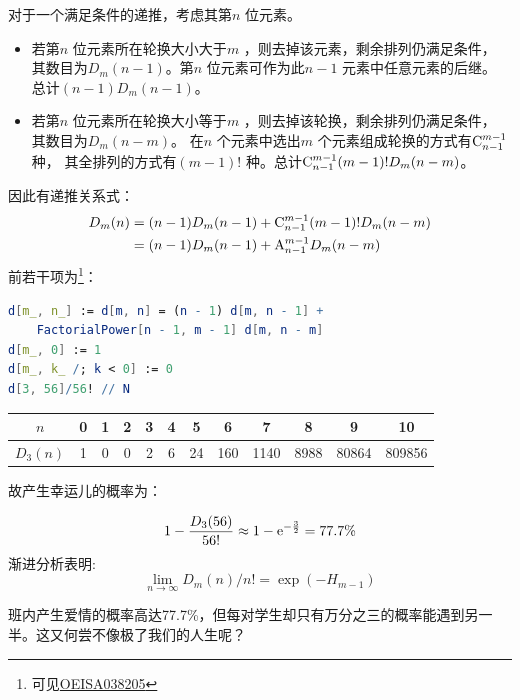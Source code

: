 对于一个满足条件的递推，考虑其第\(n\) 位元素。
\begin{itemize}
    \item 若第\(n\) 位元素所在轮换大小大于\(m\) ，则去掉该元素，剩余排列仍满足条件，
        其数目为\(D_{m}(n-1)\)。第\(n\) 位元素可作为此\(n-1\) 元素中任意元素的后继。
        总计\((n-1)D_{m}(n-1)\)。
    \item 若第\(n\) 位元素所在轮换大小等于\(m\) ，则去掉该轮换，剩余排列仍满足条件，
        其数目为\(D_{m}(n-m)\)。
        在\(n\) 个元素中选出\(m\) 个元素组成轮换的方式有\(\mathrm{C}_{n-1}^{m-1}\) 种，
        其全排列的方式有\((m-1)! \) 种。总计\(\mathrm{C}_{n-1}^{m-1}(m-1)!D_{m}(n-m)\)。
\end{itemize}
因此有递推关系式：
\begin{align*}
    D_{m}(n)&=(n-1)D_{m}(n-1)+\mathrm{C}_{n-1}^{m-1}(m-1)!D_{m}(n-m) \\
    &= (n-1)D_{m}(n-1)+\mathrm{A}_{n-1}^{m-1}D_{m}(n-m)
\end{align*}
前若干项为\footnote{可见\href{https://oeis.org/A038205}{OEISA038205}}：
\begin{lstlisting}[language=Mathematica]
d[m_, n_] := d[m, n] = (n - 1) d[m, n - 1] +
    FactorialPower[n - 1, m - 1] d[m, n - m]
d[m_, 0] := 1
d[m_, k_ /; k < 0] := 0
d[3, 56]/56! // N
\end{lstlisting}
\begin{table}[H]
    \centering
    \begin{tabular}{|*{12}{c|}}
        \hline
        \(n\)        & 0 & 1 & 2 & 3 & 4 & 5  & 6   & 7    & 8    & 9     & 10 \\
        \hline
        \(D_{3}(n)\) & 1 & 0 & 0 & 2 & 6 & 24 & 160 & 1140 & 8988 & 80864 & 809856\\
        \hline
    \end{tabular}
\end{table}
故产生幸运儿的概率为：

\[
    1-\frac{D_{3}(56)}{56!} \approx 1 - \mathrm{e}^{-\frac{3}{2}}   = 77.7\%
\]
渐进分析表明\cite[p.~176]{Generatingfunctionology}:
\[
    \lim_{n \to \infty} D_{m}(n)/n! = \exp(-H_{m-1})
\]

班内产生爱情的概率高达77.7\%，但每对学生却只有万分之三的概率能遇到另一半。这又何尝不像极了我们的人生呢？
